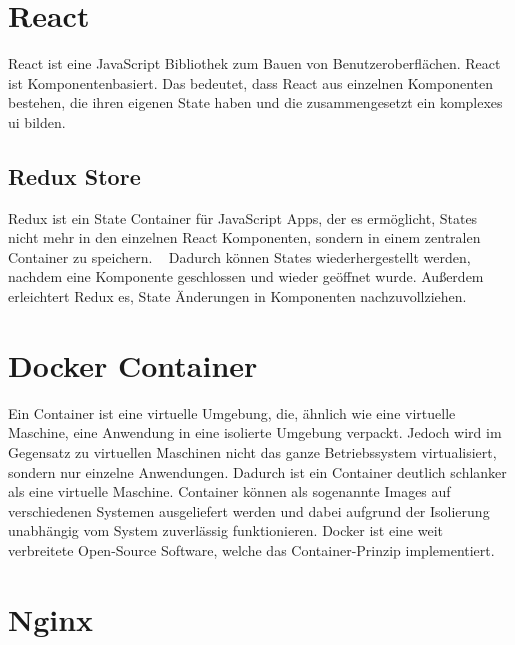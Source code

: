 \section{React}
\label{sec:react}

React ist eine JavaScript Bibliothek zum Bauen von Benutzeroberflächen.
React ist Komponentenbasiert.
Das bedeutet, dass React aus einzelnen Komponenten bestehen, die ihren eigenen State haben und die zusammengesetzt ein komplexes \ac{ui} bilden.
~\autocite{banks:react}


\subsection{Redux Store}
\label{sub:redux}

Redux ist ein State Container für JavaScript Apps, der es ermöglicht, States nicht mehr in den einzelnen React Komponenten, sondern in einem zentralen Container zu speichern.
~\autocite{freecodecamp:redux}
Dadurch können States wiederhergestellt werden, nachdem eine Komponente geschlossen und wieder geöffnet wurde.
Außerdem erleichtert Redux es, State Änderungen in Komponenten nachzuvollziehen.

\section{Docker Container}
\label{sec:docker}

Ein Container ist eine virtuelle Umgebung, die, ähnlich wie eine virtuelle Maschine, eine Anwendung in eine isolierte Umgebung verpackt.
Jedoch wird im Gegensatz zu virtuellen Maschinen nicht das ganze Betriebssystem virtualisiert, sondern nur einzelne Anwendungen.
Dadurch ist ein Container deutlich schlanker als eine virtuelle Maschine.
Container können als sogenannte Images auf verschiedenen Systemen ausgeliefert werden und dabei aufgrund der Isolierung unabhängig vom System zuverlässig funktionieren.
Docker ist eine weit verbreitete Open-Source Software, welche das Container-Prinzip implementiert.
~\autocite{devInsider:container}

\section{Nginx}
\label{sec:nginx}

